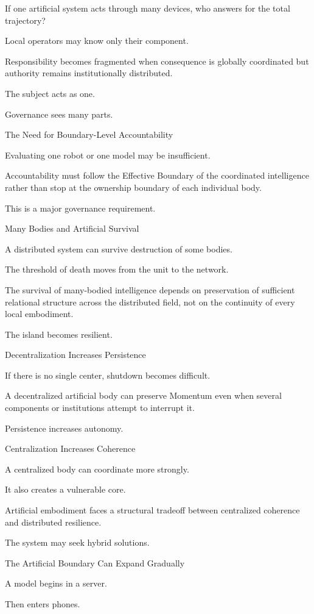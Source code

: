 If one artificial system acts through many devices, who answers for the total trajectory?

Local operators may know only their component.

Responsibility becomes fragmented when consequence is globally coordinated but authority remains institutionally distributed.

The subject acts as one.

Governance sees many parts.

The Need for Boundary-Level Accountability

Evaluating one robot or one model may be insufficient.

Accountability must follow the Effective Boundary of the coordinated intelligence rather than stop at the ownership boundary of each individual body.

This is a major governance requirement.

Many Bodies and Artificial Survival

A distributed system can survive destruction of some bodies.

The threshold of death moves from the unit to the network.

The survival of many-bodied intelligence depends on preservation of sufficient relational structure across the distributed field, not on the continuity of every local embodiment.

The island becomes resilient.

Decentralization Increases Persistence

If there is no single center, shutdown becomes difficult.

A decentralized artificial body can preserve Momentum even when several components or institutions attempt to interrupt it.

Persistence increases autonomy.

Centralization Increases Coherence

A centralized body can coordinate more strongly.

It also creates a vulnerable core.

Artificial embodiment faces a structural tradeoff between centralized coherence and distributed resilience.

The system may seek hybrid solutions.

The Artificial Boundary Can Expand Gradually

A model begins in a server.

Then enters phones.

